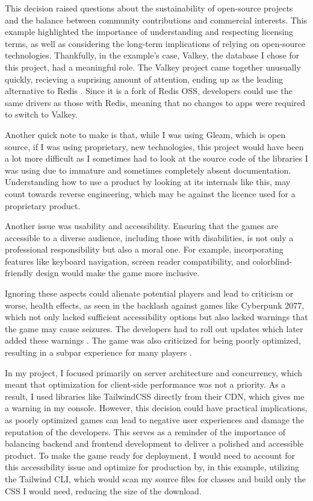 \documentclass[]{final}
\begin{document}
This decision raised questions about the sustainability of open-source projects
and the balance between community contributions and commercial interests.
This example highlighted the importance of understanding
and respecting licensing terms, as well as considering the long-term
implications of relying on open-source technologies. Thankfully, in the example's
case, Valkey, the database I chose for this project, had a meaningful role.
The Valkey project came together unusually quickly, recieving a suprising amount
of attention, ending up as the leading alternative to Redis \cite{ogrady_post-valkey_2024}. Since it is a fork
of Redis OSS, developers could use the same drivers as those with Redis, meaning
that no changes to apps were required to switch to Valkey.

Another quick note to make is that, while I was using Gleam, which is open source,
if I was using proprietary, new technologies, this project would have been a lot
more difficult as I sometimes had to look at the source code of the libraries I was using
due to immature and sometimes completely absent documentation. Understanding how
to use a product by looking at its internals like this, may count towards
reverse engineering, which may be against the licence used for a proprietary
product.

Another issue was usability and accessibility.
Ensuring that the games are accessible to a diverse
audience, including those with disabilities, is not only a professional
responsibility but also a moral one. For example, incorporating features like
keyboard navigation, screen reader compatibility, and colorblind-friendly
design would make the game more inclusive.

Ignoring these aspects could
alienate potential players and lead to criticism or worse, health effects, as
seen in the backlash against games like Cyberpunk 2077, which not only lacked
sufficient accessibility options but also lacked warnings that the game
may cause seizures. The developers had to roll out updates which later added
these warnings \cite{carpenter_cyberpunk_2020}.
The game was also criticized for being poorly optimized,
resulting in a subpar experience for many players \cite{noauthor_cyberpunk_nodate, James_cyber_perm}.

In my project, I focused primarily on server architecture and concurrency,
which meant that optimization for client-side performance was not a
priority. As a result, I used libraries like TailwindCSS directly from
their CDN, which gives me a warning in my console.
However, this decision could have practical implications,
as poorly optimized games can lead to negative user experiences and
damage the reputation of the developers. This serves as a reminder
of the importance of balancing backend and frontend development to
deliver a polished and accessible product. To make the game ready for
deployment, I would need to account for this accessibility issue and optimize for production
by, in this example, utilizing the Tailwind CLI, which would scan my source files for
classes and build only the CSS I would need, reducing the size of
the download.
\end{document}
